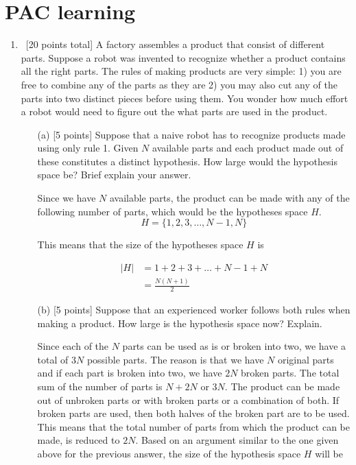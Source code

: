 \section{PAC learning}
\label{sec:pac-learning}
\begin{enumerate}

\item ~[20 points total] A factory assembles a product that consist of
  different parts. Suppose a robot was invented to recognize whether a
  product contains all the right parts. The rules of making products
  are very simple: 1) you are free to combine any of the parts as they
  are 2) you may also cut any of the parts into two distinct pieces
  before using them. You wonder how much effort a robot would need to
  figure out the what parts are used in the product.

\begin{itemize}
\item[(a)] [5 points] Suppose that a naive robot has to recognize
  products made using only rule 1. Given $N$ available parts and each
  product made out of these constitutes a distinct hypothesis. How
  large would the hypothesis space be? Brief explain your answer.
    
Since we have $N$ available parts, the product can be made with any of the following number of parts, which would be the hypotheses space $H$.
$$
H = \{1, 2, 3,\ldots, N-1, N \}
$$

This means that the size of the hypotheses space $H$ is 

\begin{equation*}
\begin{aligned}
\left | H \right | &= 1 + 2 + 3 + \ldots + N-1 + N\\
&= \frac{N (N+1)}{2}
\end{aligned}
\end{equation*}

\item[(b)] [5 points] Suppose that an experienced worker follows both
  rules when making a product. How large is the hypothesis space now?
  Explain.

Since each of the $N$ parts can be used as is or broken into two, we have a total of $3N$  possible parts. The reason is that we have $N$ original parts and if each part is broken into two, we have $2N$ broken parts. The total sum of the number of parts is $N + 2N$ or $3N$. The product can be made out of unbroken parts or with broken parts or a combination of both. If broken parts are used, then both halves of the broken part are to be used. This means that the total number of parts from which the product can be made, is reduced to $2N$. Based on an argument similar to the one given above for the previous answer, the size of the hypothesis space $H$ will be


\end{itemize}
\end{enumerate}
